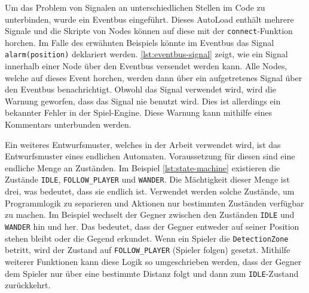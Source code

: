 Um das Problem von Signalen an unterschiedlichen Stellen im Code zu unterbinden, wurde ein Eventbus eingeführt\cite{dzone-eventbus}.
Dieses AutoLoad enthält mehrere Signale und die Skripte von Nodes können auf diese mit der \texttt{connect}-Funktion horchen.
Im Falle des erwähnten Beispiels könnte im Eventbus das Signal \texttt{alarm(position)} deklariert werden.
\autoref{lst:eventbus-signal} zeigt, wie ein Signal innerhalb einer Node über den Eventbus versendet werden kann.
Alle Nodes, welche auf dieses Event horchen, werden dann über ein aufgetretenes Signal über den Eventbus benachrichtigt.
Obwohl das Signal verwendet wird, wird die Warnung geworfen, dass das Signal nie benutzt wird.
Dies ist allerdings ein bekannter Fehler in der Spiel-Engine\cite{godot-signal-warning}.
Diese Warnung kann mithilfe eines Kommentars unterbunden werden. \\


Ein weiteres Entwurfsmuster, welches in der Arbeit verwendet wird, ist das Entwurfsmuster eines endlichen Automaten\cite{gamepattern-state}.
Voraussetzung für diesen sind eine endliche Menge an Zuständen.
Im Beispiel \autoref{lst:state-machine} existieren die Zustände \texttt{IDLE}, \texttt{FOLLOW\_PLAYER} und \texttt{WANDER}.
Die Mächtigkeit dieser Menge ist drei, was bedeutet, dass sie endlich ist.
Verwendet werden solche Zustände, um Programmlogik zu separieren und Aktionen nur bestimmten Zuständen verfügbar zu machen.
Im Beispiel wechselt der Gegner zwischen den Zuständen \texttt{IDLE} und \texttt{WANDER} hin und her.
Das bedeutet, dass der Gegner entweder auf seiner Position stehen bleibt oder die Gegend erkundet.
Wenn ein Spieler die \texttt{DetectionZone} betritt, wird der Zustand auf \texttt{FOLLOW\_PLAYER} (Spieler folgen) gesetzt.
Mithilfe weiterer Funktionen kann diese Logik so umgeschrieben werden, dass der Gegner dem Spieler nur über eine bestimmte Distanz folgt und dann zum \texttt{IDLE}-Zustand zurückkehrt.\\
